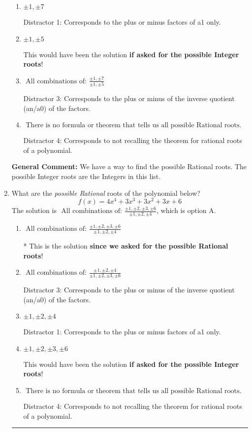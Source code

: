 \documentclass{extbook}[14pt]
\newcommand{\litem}[1]{\item #1

\rule{\textwidth}{0.4pt}}
\begin{document}
\begin{enumerate}
{\begin{enumerate}[label=\Alph*.]
* This is the solution \textbf{since we asked for the possible Rational roots}!
\item \( \pm 1,\pm 7 \)

 Distractor 1: Corresponds to the plus or minus factors of a1 only.
\item \( \pm 1,\pm 5 \)

This would have been the solution \textbf{if asked for the possible Integer roots}!
\item \( \text{ All combinations of: }\frac{\pm 1,\pm 7}{\pm 1,\pm 5} \)

 Distractor 3: Corresponds to the plus or minus of the inverse quotient (an/a0) of the factors. 
\item \( \text{ There is no formula or theorem that tells us all possible Rational roots.} \)

 Distractor 4: Corresponds to not recalling the theorem for rational roots of a polynomial.
\end{enumerate}

\textbf{General Comment:} We have a way to find the possible Rational roots. The possible Integer roots are the Integers in this list.
}
\litem{
What are the \textit{possible Rational} roots of the polynomial below?
\[ f(x) = 4x^{4} +3 x^{3} +3 x^{2} +3 x + 6 \]The solution is \( \text{ All combinations of: }\frac{\pm 1,\pm 2,\pm 3,\pm 6}{\pm 1,\pm 2,\pm 4} \), which is option A.\begin{enumerate}[label=\Alph*.]
\item \( \text{ All combinations of: }\frac{\pm 1,\pm 2,\pm 3,\pm 6}{\pm 1,\pm 2,\pm 4} \)

* This is the solution \textbf{since we asked for the possible Rational roots}!
\item \( \text{ All combinations of: }\frac{\pm 1,\pm 2,\pm 4}{\pm 1,\pm 2,\pm 3,\pm 6} \)

 Distractor 3: Corresponds to the plus or minus of the inverse quotient (an/a0) of the factors. 
\item \( \pm 1,\pm 2,\pm 4 \)

 Distractor 1: Corresponds to the plus or minus factors of a1 only.
\item \( \pm 1,\pm 2,\pm 3,\pm 6 \)

This would have been the solution \textbf{if asked for the possible Integer roots}!
\item \( \text{ There is no formula or theorem that tells us all possible Rational roots.} \)

 Distractor 4: Corresponds to not recalling the theorem for rational roots of a polynomial.
\end{enumerate}

}
\end{enumerate}
\end{document}
